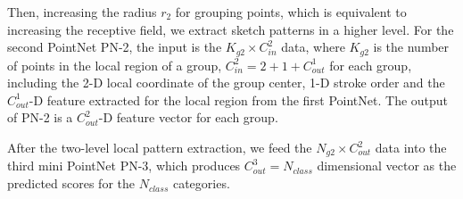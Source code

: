 Then, increasing the radius $r_2$ for grouping points, which is equivalent to increasing the receptive field, we extract sketch patterns in a higher level.
%
For the second PointNet PN-2, the input is the $K_{g2} \times C^2_{in}$ data, where $K_{g2}$ is the number of points in the local region of a group, $C^2_{in}=2+1+C^1_{out}$ for each group, including the 2-D local coordinate of the group center, 1-D stroke order and the $C^1_{out}$-D feature extracted for the local region from the first PointNet.
%
The output of PN-2 is a $C^2_{out}$-D feature vector for each group.

After the two-level local pattern extraction, we feed the $N_{g2} \times C^2_{out}$ data into the third mini PointNet PN-3, which produces $C^{3}_{out}=N_{class}$ dimensional vector as the predicted scores for the $N_{class}$ categories.




